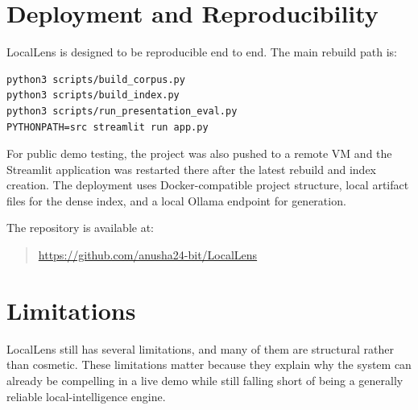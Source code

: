 \documentclass[11pt]{article}
\begin{document}
\section{Deployment and Reproducibility}
LocalLens is designed to be reproducible end to end. The main rebuild path is:
\begin{verbatim}
python3 scripts/build_corpus.py
python3 scripts/build_index.py
python3 scripts/run_presentation_eval.py
PYTHONPATH=src streamlit run app.py
\end{verbatim}

For public demo testing, the project was also pushed to a remote VM and the Streamlit application was restarted there after the latest rebuild and index creation. The deployment uses Docker-compatible project structure, local artifact files for the dense index, and a local Ollama endpoint for generation.

The repository is available at:
\begin{quote}
\url{https://github.com/anusha24-bit/LocalLens}
\end{quote}

\section{Limitations}
LocalLens still has several limitations, and many of them are structural rather than cosmetic. These limitations matter because they explain why the system can already be compelling in a live demo while still falling short of being a generally reliable local-intelligence engine.
\end{document}
